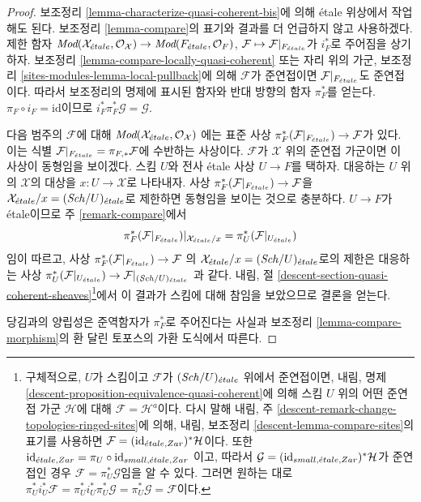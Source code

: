 \begin{proof}
보조정리 \ref{lemma-characterize-quasi-coherent-bis}에 의해
\'etale 위상에서 작업해도 된다. 보조정리 \ref{lemma-compare}의
표기와 결과를 더 언급하지 않고 사용하겠다.
제한 함자
$\textit{Mod}(\mathcal{X}_{\acute{e}tale}, \mathcal{O}_\mathcal{X}) \to
\textit{Mod}(F_{\acute{e}tale}, \mathcal{O}_F)$,
$\mathcal{F} \mapsto \mathcal{F}|_{F_{\acute{e}tale}}$가 $i_F^*$로
주어짐을 상기하자. 보조정리
\ref{lemma-compare-locally-quasi-coherent} 또는 자리 위의 가군,
보조정리 \ref{sites-modules-lemma-local-pullback}에 의해
$\mathcal{F}$가 준연접이면 $\mathcal{F}|_{F_{\acute{e}tale}}$도 준연접이다.
따라서 보조정리의 명제에 표시된 함자와 반대 방향의 함자
$\pi_F^*$를 얻는다. $\pi_F \circ i_F = \text{id}$이므로
$i_F^*\pi_F^*\mathcal{G} = \mathcal{G}$.

\medskip\noindent
다음 범주의 $\mathcal{F}$에 대해
$\textit{Mod}(\mathcal{X}_{\acute{e}tale}, \mathcal{O}_\mathcal{X})$
에는 표준 사상
$\pi_F^*(\mathcal{F}|_{F_{\acute{e}tale}}) \to \mathcal{F}$가 있다.
이는 식별
$\mathcal{F}|_{F_{\acute{e}tale}} = \pi_{F, *}\mathcal{F}$에
수반하는 사상이다. $\mathcal{F}$가 $\mathcal{X}$ 위의
준연접 가군이면 이 사상이 동형임을 보이겠다.
스킴 $U$와 전사 \'etale 사상 $U \to F$를 택하자.
대응하는 $U$ 위의 $\mathcal{X}$의 대상을
$x : U \to \mathcal{X}$로 나타내자. 사상
$\pi_F^*(\mathcal{F}|_{F_{\acute{e}tale}}) \to \mathcal{F}$을
$\mathcal{X}_{\acute{e}tale}/x = (\mathit{Sch}/U)_{\acute{e}tale}$로 제한하면
동형임을 보이는 것으로 충분하다.
$U \to F$가 \'etale이므로 주 \ref{remark-compare}에서
$$
\pi_F^*(\mathcal{F}|_{F_{\acute{e}tale}})|_{\mathcal{X}_{\acute{e}tale}/x} =
\pi_U^*(\mathcal{F}|_{U_{\acute{e}tale}})
$$
임이 따르고, 사상
$\pi_F^*(\mathcal{F}|_{F_{\acute{e}tale}}) \to \mathcal{F}$
의 $\mathcal{X}_{\acute{e}tale}/x = (\mathit{Sch}/U)_{\acute{e}tale}$로의 제한은
대응하는 사상
$\pi_U^*(\mathcal{F}|_{U_{\acute{e}tale}}) \to \mathcal{F}|_{(\mathit{Sch}/U)_{\acute{e}tale}}$
과 같다. 내림, 절
\ref{descent-section-quasi-coherent-sheaves}\footnote{구체적으로,
$U$가 스킴이고 $\mathcal{F}$가 $(\mathit{Sch}/U)_{\acute{e}tale}$ 위에서 준연접이면,
내림, 명제 \ref{descent-proposition-equivalence-quasi-coherent}에 의해
스킴 $U$ 위의 어떤 준연접 가군 $\mathcal{H}$에 대해
$\mathcal{F} = \mathcal{H}^a$이다. 다시 말해 내림, 주
\ref{descent-remark-change-topologies-ringed-sites}에 의해,
내림, 보조정리 \ref{descent-lemma-compare-sites}의 표기를 사용하면
$\mathcal{F} = (\text{id}_{{\acute{e}tale},Zar})^*\mathcal{H}$이다.
또한
$\text{id}_{{\acute{e}tale},Zar} = \pi_U \circ \text{id}_{small,{\acute{e}tale},Zar}$
이고, 따라서
$\mathcal{G} = (\text{id}_{small,{\acute{e}tale},Zar})^*\mathcal{H}$가
준연접인 경우 $\mathcal{F} = \pi_U^*\mathcal{G}$임을 알 수 있다.
그러면 원하는 대로
$\pi_U^*i_U^*\mathcal{F} = \pi_U^*i_U^*\pi_U^*\mathcal{G} =
\pi_U^*\mathcal{G} = \mathcal{F}$이다.}에서 이 결과가 스킴에 대해
참임을 보았으므로 결론을 얻는다.

\medskip\noindent
당김과의 양립성은 준역함자가 $\pi_F^*$로 주어진다는 사실과
보조정리 \ref{lemma-compare-morphism}의 환 달린 토포스의
가환 도식에서 따른다.
\end{proof}


